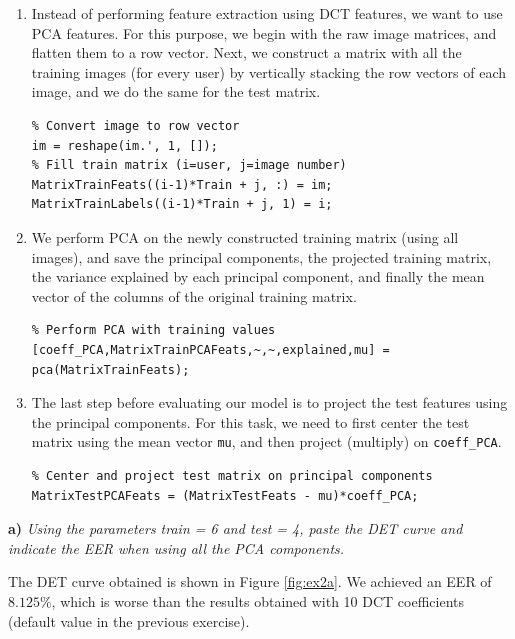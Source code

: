 \documentclass[11pt]{article}
\begin{document}
\begin{enumerate}
  \item Instead of performing feature extraction using DCT features, we want to use PCA features. For this purpose, we begin with the raw image matrices, and flatten them to a row vector. Next, we construct a matrix with all the training images (for every user) by vertically stacking the row vectors of each image, and we do the same for the test matrix.
  \begin{verbatim}
% Convert image to row vector
im = reshape(im.', 1, []);
% Fill train matrix (i=user, j=image number)
MatrixTrainFeats((i-1)*Train + j, :) = im;
MatrixTrainLabels((i-1)*Train + j, 1) = i;
  \end{verbatim}
  \item We perform PCA on the newly constructed training matrix (using all images), and save the principal components, the projected training matrix, the variance explained by each principal component, and finally the mean vector of the columns of the original training matrix.
  \begin{verbatim}
% Perform PCA with training values
[coeff_PCA,MatrixTrainPCAFeats,~,~,explained,mu] = pca(MatrixTrainFeats);
  \end{verbatim}
\item The last step before evaluating our model is to project the test features using the principal components. For this task, we need to first center the test matrix using the mean vector \verb|mu|, and then project (multiply) on \verb|coeff_PCA|.
\begin{verbatim}
% Center and project test matrix on principal components
MatrixTestPCAFeats = (MatrixTestFeats - mu)*coeff_PCA;
\end{verbatim}
\end{enumerate}

\textbf{a)} \emph{Using the parameters train = 6 and test = 4, paste the DET curve and indicate the EER when using all the PCA components.}

The DET curve obtained is shown in Figure \ref{fig:ex2a}. We achieved an EER of $8.125\%$, which is worse than the results obtained with 10 DCT coefficients (default value in the previous exercise).
\end{document}
